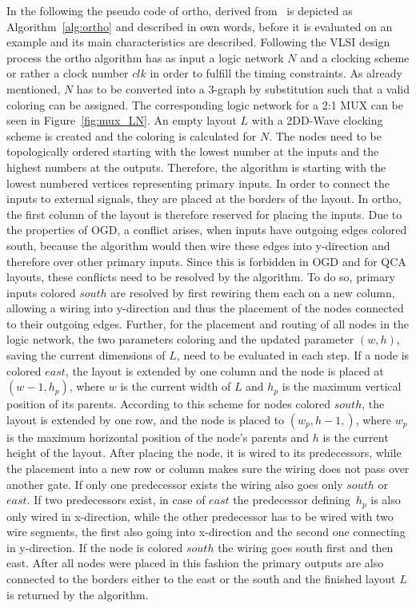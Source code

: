 In the following the pseudo code of ortho, derived from~\cite{ortho} is depicted as Algorithm~\ref{alg:ortho} and described in own words, before it is evaluated on an example and its main characteristics are described. Following the VLSI design process the ortho algorithm has as input a logic network $N$ and a clocking scheme or rather a clock number $clk$ in order to fulfill the timing constraints. As already mentioned, $N$ has to be converted into a 3-graph by substitution such that a valid coloring can be assigned. The corresponding logic network for a 2:1 MUX can be seen in Figure~\ref{fig:mux_LN}. An empty layout $L$ with a 2DD-Wave clocking scheme is created and the coloring is calculated for $N$. The nodes need to be topologically ordered starting with the lowest number at the inputs and the highest numbers at the outputs. Therefore, the algorithm is starting with the lowest numbered vertices representing primary inputs. In order to connect the inputs to external signals, they are placed at the borders of the layout. In ortho, the first column of the layout is therefore reserved for placing the inputs. Due to the properties of OGD, a conflict arises, when inputs have outgoing edges colored south, because the algorithm would then wire these edges into y-direction and therefore over other primary inputs. Since this is forbidden in OGD and for QCA layouts, these conflicts need to be resolved by the algorithm. To do so, primary inputs colored $south$ are resolved by first rewiring them each on a new column, allowing a wiring into y-direction and thus the placement of the nodes connected to their outgoing edges. Further, for the placement and routing of all nodes in the logic network, the two parameters coloring and the updated parameter $(w, h)$, saving the current dimensions of $L$, need to be evaluated in each step. If a node is colored $east$, the layout is extended by one column and the node is placed at $(w-1, h_p)$, where $w$ is the current width of $L$ and $h_p$ is the maximum vertical position of its parents. According to this scheme for nodes colored $south$, the layout is extended by one row, and the node is placed to $(w_p, h-1,)$, where $w_p$ is the maximum horizontal position of the node's parents and $h$ is the current height of the layout. After placing the node, it is wired to its predecessors, while the placement into a new row or column makes sure the wiring does not pass over another gate. If only one predecessor exists the wiring also goes only $south$ or $east$. If two predecessors exist, in case of $east$ the predecessor defining~$h_p$ is also only wired in x-direction, while the other predecessor has to be wired with two wire segments, the first also going into x-direction and the second one connecting in y-direction. If the node is colored $south$ the wiring goes south first and then east. After all nodes were placed in this fashion the primary outputs are also connected to the borders either to the east or the south and the finished layout $L$ is returned by the algorithm.



